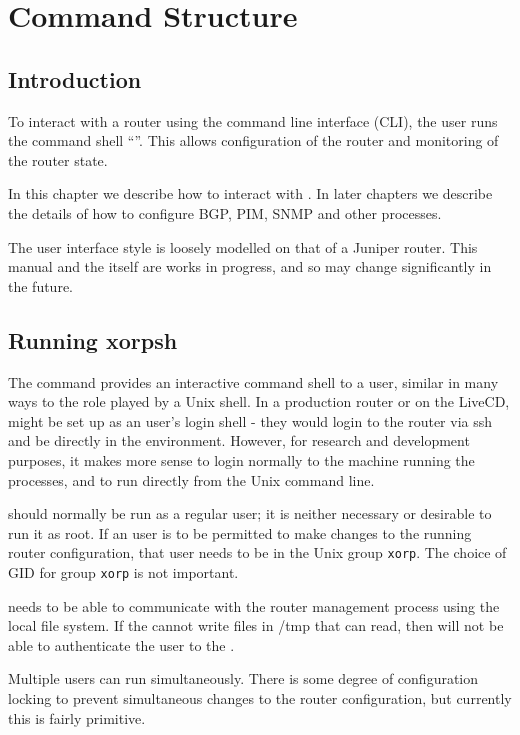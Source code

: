 %
%

\chapter{Command Structure}
\label{xorpsh}

\section{Introduction}
To interact with a \xorp router using the command line interface (CLI),
the user runs the \xorp command shell ``\xorpsh''.  This allows
configuration of the router and monitoring of the router state.

In this chapter we describe how to interact with \xorpsh.  In later
chapters we describe the details of how to configure BGP, PIM, SNMP and
other processes.

The user interface style is loosely modelled on that of a Juniper
router.  This manual and the \xorpsh itself are works in progress, and
so may change significantly in the future.

\section{Running xorpsh}
The \xorpsh command provides an interactive command shell to a \xorp user,
similar in many ways to the role played by a Unix shell.  In a production
router or on the \xorp LiveCD, \xorpsh might be set up as an user's
login shell - they would login to the router via ssh and be directly
in the \xorpsh environment.  However, for research and development
purposes, it makes more sense to login normally to the machine running
the \xorp processes, and to run \xorpsh directly from the Unix command
line.

\xorpsh should normally be run as a regular user; it is neither
necessary or desirable to run it as root.  If an user is to be
permitted to make changes to the running router configuration, that user
needs to be in the Unix group {\tt xorp}.  The choice of GID for group
{\tt xorp} is not important.

\xorpsh needs to be able to communicate with the \xorp router
management process \rtrmgr using the local file system.  If
the \rtrmgr cannot write files in /tmp that \xorpsh can read, then
\xorpsh will not be able to authenticate the user to the \rtrmgr.

Multiple users can run \xorpsh simultaneously.  There is some degree of
configuration locking to prevent simultaneous changes to the router
configuration, but currently this is fairly primitive.

